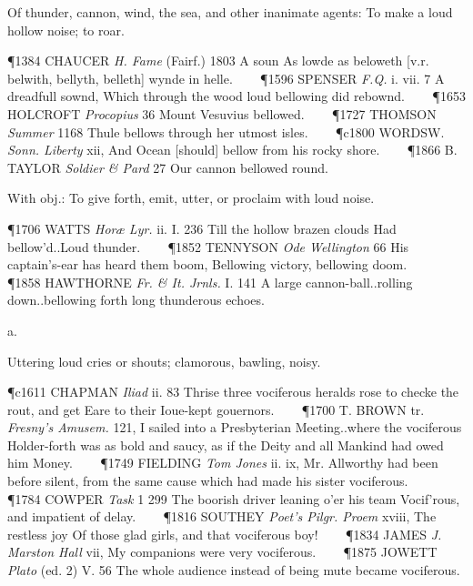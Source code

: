 \begin{description}[wide, labelwidth=!, labelindent=0pt]
\begin{myenumerate}
 Of thunder, cannon, wind, the sea, and other inanimate agents: To make a loud hollow noise; to roar.

\P 1384 CHAUCER  \textit{H. Fame} (Fairf.) 1803 A  soun As lowde as beloweth [v.r. belwith, bellyth, belleth] wynde in helle.    
\P 1596 SPENSER  \textit{F.Q.} i. vii. 7 A dreadfull sownd, Which through the wood loud bellowing did rebownd.    
\P 1653 HOLCROFT  \textit{Procopius} 36 Mount Vesuvius bellowed.    
\P 1727 THOMSON \textit{Summer} 1168 Thule  bellows through her utmost isles.    
\P c1800 WORDSW.  \textit{Sonn. Liberty} xii, And Ocean [should] bellow from his rocky shore.    
\P 1866 B. TAYLOR  \textit{Soldier \& Pard} 27 Our cannon bellowed round.

 With obj.: To give forth, emit, utter, or proclaim with loud noise.

\P 1706 WATTS  \textit{Horæ Lyr.} ii. I. 236 Till the hollow brazen clouds Had bellow'd..Loud thunder.    
\P 1852 TENNYSON  \textit{Ode Wellington} 66 His captain's-ear has heard them boom, Bellowing victory, bellowing doom.    
\P 1858 HAWTHORNE  \textit{Fr. \& It. Jrnls.} I. 141 A large cannon-ball..rolling down..bellowing forth long thunderous echoes.
\end{myenumerate}


 a.

\noindent {}

\vspace{-0.3cm}

\begin{myenumerate}

 Uttering loud cries or shouts; clamorous, bawling, noisy.

\P c1611 CHAPMAN  \textit{Iliad} ii. 83 Thrise three vociferous heralds rose to checke the rout, and get Eare to their Ioue-kept gouernors.    
\P 1700 T. BROWN tr.  \textit{Fresny's Amusem.} 121, I sailed into a Presbyterian Meeting..where the vociferous Holder-forth was as bold and saucy, as if the Deity and all Mankind had owed him Money.    
\P 1749 FIELDING  \textit{Tom Jones} ii. ix, Mr. Allworthy had been before silent, from the same cause which had made his sister vociferous.    
\P 1784 COWPER  \textit{Task} 1 299 The boorish driver leaning o'er his team Vocif'rous, and impatient of delay.    
\P 1816 SOUTHEY  \textit{Poet's Pilgr. Proem} xviii, The restless joy Of those glad girls, and that vociferous boy!    
\P 1834 JAMES  \textit{J. Marston Hall} vii, My companions were very vociferous.    
\P 1875 JOWETT  \textit{Plato} (ed. 2) V. 56 The whole audience instead of being mute became vociferous.


\end{myenumerate}
\end{description}
